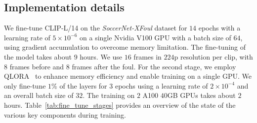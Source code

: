 \subsection{Implementation details}
We fine-tune CLIP-L/14 on the \textit{SoccerNet-XFoul} dataset for $14$ epochs with a learning rate of $5\times10^{-6}$ on a single Nvidia V100 GPU with a batch size of $64$, using gradient accumulation to 
overcome memory limitation.
The fine-tuning of the model takes about $9$ hours. We use $16$ frames in $224$p resolution per clip, with $8$ frames before and $8$ frames after the foul. %
For the second stage, we employ QLORA~\cite{Hu2021LoRA-arxiv, Dettmers2023QLoRA-arxiv} to enhance memory efficiency and enable training on a single GPU.
We only fine-tune $1$\% of the layers for $3$ epochs using a learning rate of $2\times10^{-4}$ and an
overall batch size of $32$. The training on $2$ A100 $40$GB GPUs takes about $2$ hours.
Table~\ref{tab:fine_tune_stages} provides an overview of the state of the various key components during training.

